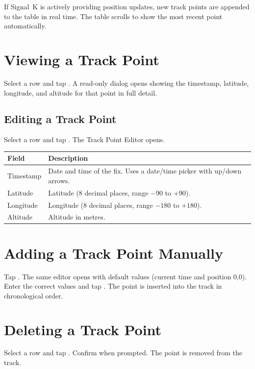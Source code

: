 If Signal~K is actively providing position updates, new track points are appended to the table in
real time.
The table scrolls to show the most recent point automatically.

\section{Viewing a Track Point}

Select a row and tap . A read-only dialog opens showing the timestamp, latitude, longitude,
and altitude for that point in full detail.

\subsection{Editing a Track Point}

Select a row and tap . The Track Point Editor opens.

\begin{longtable}{L{3cm} L{10.7cm}}
\toprule
{}
{\sffamily\bfseries\color{white} Field} &
{\sffamily\bfseries\color{white} Description} \\
\midrule
Timestamp & Date and time of the fix. Uses a date/time picker with up/down arrows. \\
Latitude & Latitude (8 decimal places, range $-90$ to $+90$). \\
Longitude & Longitude (8 decimal places, range $-180$ to $+180$). \\
Altitude & Altitude in metres. \\
\bottomrule
\end{longtable}

\section{Adding a Track Point Manually}

Tap . The same editor opens with default values (current time and position 0,0).
Enter the correct values and tap .
The point is inserted into the track in chronological order.

\section{Deleting a Track Point}

Select a row and tap . Confirm when prompted. The point is removed from the track.

